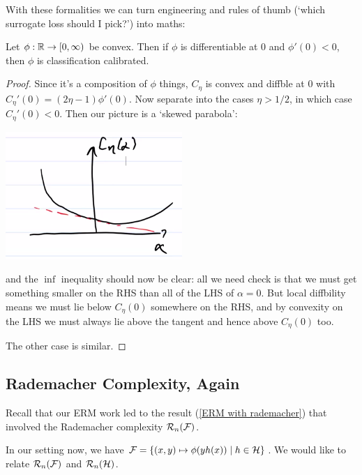 \documentclass[11pt]{scrartcl}
\begin{document}
With these formalities we can turn engineering and rules of thumb (`which surrogate loss should I pick?') into maths:

\begin{theorem}
Let $\phi : \mathbb R \rightarrow [0, \infty)$ be convex. Then if $\phi$ is differentiable at 0 and $\phi'(0)<0$, then $\phi$ is classification calibrated.

\begin{proof}
Since it's a composition of $\phi$ things, $C_\eta$ is convex and diffble at 0 with $C_\eta'(0) = (2\eta - 1)\phi'(0)$. Now separate into the cases $\eta > 1/2$, in which case $C_\eta'(0) < 0$. Then our picture is a `skewed parabola':

\begin{center}
\includegraphics[scale=0.75]{skewparab.png}
\label{surrogates picture}
\end{center}

and the $\inf$ inequality should now be clear: all we need check is that we must get something smaller on the RHS than all of the LHS of $\alpha = 0$. But local diffbility means we must lie below $C_\eta(0)$ somewhere on the RHS, and by convexity on the LHS we must always lie above the tangent and hence above $C_\eta(0)$ too.

The other case is similar.
\end{proof}
\end{theorem}


\subsection{Rademacher Complexity, Again}

Recall that our ERM work led to the result (\ref{ERM with rademacher}) that involved the Rademacher complexity $\mathcal{R}_n(\mathcal{F})$.

In our setting now, we have $\mathcal{F} = \{ (x,y) \mapsto \phi( y h(x) ) \mid h \in \mathcal{H} \} $. We would like to relate $\mathcal{R}_n(\mathcal{F})$ and $\mathcal{R}_n(\mathcal{H})$.
\end{document}
